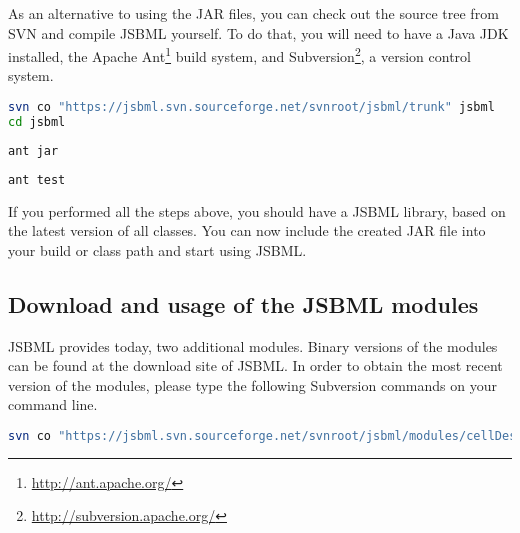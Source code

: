 As an alternative to using the JAR files, you can check out the source tree from
SVN and compile JSBML yourself. To do that, you will need to have a Java
JDK installed, the Apache
Ant\footnote{\url{http://ant.apache.org/}\label{fn:ant}} build system, and
Subversion\footnote{\url{http://subversion.apache.org/}\label{fn:svn}}, a
version control system.

\begin{lstlisting}[language=bash,numbers=none,captionpos=t,
title={Use the following command to download the latest JSBML classes (requires
Subversion\footref{fn:svn}):},label=SVN]
svn co "https://jsbml.svn.sourceforge.net/svnroot/jsbml/trunk" jsbml
cd jsbml
\end{lstlisting}

\begin{lstlisting}[language=bash,numbers=none,captionpos=t,
title={To compile the JSBML library to a single JAR file, type the following
command (requires Apache Ant\footref{fn:ant}):}]
ant jar
\end{lstlisting}

\begin{lstlisting}[language=bash,numbers=none,captionpos=t,
title={If you want to run the JUnit\footref{fn:junit} tests
on your compiled JAR file, please use the following command:}]
ant test
\end{lstlisting}

If you performed all the steps above, you should have a JSBML library, based on
the latest version of all classes. You can now include the created JAR file into
your build or class path and start using JSBML.

\subsection{Download and usage of the JSBML modules}

JSBML provides today, two additional modules. Binary versions of the modules can
be found at the download site of JSBML. In order to obtain the most recent
version of the modules, please type the following Subversion
commands on your command line.

\begin{lstlisting}[language=bash,numbers=none,captionpos=t,
title={The CellDesigner bridge module should help CellDesigner plugin developers
to use JSBML as internal data structure.}]
svn co "https://jsbml.svn.sourceforge.net/svnroot/jsbml/modules/cellDesigner" cellDesigner
\end{lstlisting}

